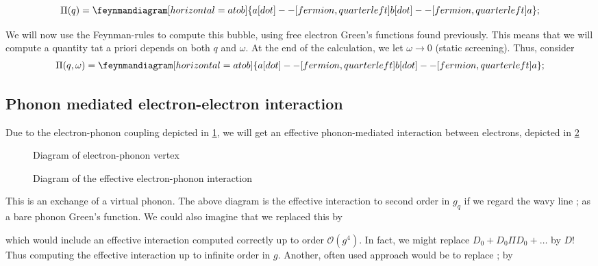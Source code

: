 \begin{equation*}
	\Pi(q) = 	\begin{gathered}
	\feynmandiagram[horizontal = a to b]{a[dot]--[fermion, quarter left] b[dot] --[fermion, quarter left] a};
	\end{gathered}
\end{equation*}

 We will now use the Feynman-rules to compute this bubble, using free electron Green's functions found previously. This means that we will compute a quantity tat a priori depends on both $q$ and $\omega$. At the end of the calculation, we let $\omega\rightarrow0$ (static screening).
 Thus, consider
 \begin{equation*}
 		\Pi(q, \omega) = 	\begin{gathered}
 	\feynmandiagram[horizontal = a to b]{a[dot]--[fermion, quarter left] b[dot] --[fermion, quarter left] a};
 	\end{gathered}
 \end{equation*}


\subsection{Phonon mediated electron-electron interaction}

Due to the electron-phonon coupling depicted in \cref{fig:el-ph-vertex}, we will get an effective phonon-mediated interaction between electrons, depicted in \cref{fig:el-ph-interaction}

\begin{figure}
	\centering
	
	\caption{Diagram of electron-phonon vertex}
	\label{fig:el-ph-vertex}
\end{figure}


\begin{figure}
	\centering
	
	\caption{Diagram of the effective electron-phonon interaction}
	\label{fig:el-ph-interaction}
\end{figure}


This is an exchange of a virtual phonon. The above diagram is the effective interaction to second order in $g_q$ if we regard the wavy line ; as a bare phonon Green's function. We could also imagine that we replaced this by

which would include an effective interaction computed correctly up to order $\mathcal{O}(g^4)$. In fact, we might replace $D_0 + D_0\Pi D_0 +\dots$ by $D!$ Thus computing the effective interaction up to infinite order in $g$. Another, often used approach would be to replace ; by  

